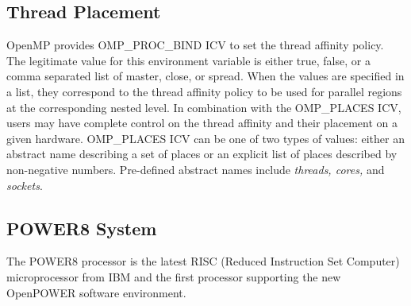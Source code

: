 \subsection{Thread Placement}
OpenMP provides OMP\_PROC\_BIND ICV to set the thread affinity policy. The legitimate value for this environment variable is either true, false, or a comma separated list of master, close, or spread. When the values are specified in a list, they correspond to the thread affinity policy to be used for parallel regions at the corresponding nested level. In combination 
with the OMP\_PLACES ICV, users may have complete control on the thread affinity and their placement 
on a given hardware. OMP\_PLACES ICV can be one of two types of values: either an abstract name describing a set of places or an explicit list of places described by non-negative numbers. Pre-defined abstract names include \textit{threads, cores,} and \textit{sockets}.

\subsection{POWER8 System}
The POWER8 processor is the latest RISC (Reduced Instruction Set Computer) microprocessor from IBM and the first processor supporting the new OpenPOWER software environment.






 